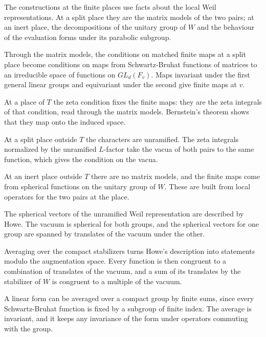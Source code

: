 The constructions at the finite places use facts about the local Weil
representations. At a split place they are the matrix models of the two pairs;
at an inert place, the decompositions of the unitary group of $W$ and the
behaviour of the evaluation forms under its parabolic subgroup.

Through the matrix models, the conditions on matched finite maps at a split place
become conditions on maps from Schwartz-Bruhat functions of matrices to an
irreducible space of functions on $GL_d(F_v)$. Maps invariant under the first
general linear groups and equivariant under the second give finite maps at $v$.

At a place of $T$ the zeta condition fixes the finite maps: they are the zeta
integrals of that condition, read through the matrix models. Bernstein's theorem
shows that they map onto the induced space.

At a split place outside $T$ the characters are unramified. The zeta integrals
normalized by the unramified $L$-factor take the vacua of both pairs to the same
function, which gives the condition on the vacua.

At an inert place outside $T$ there are no matrix models, and the finite maps
come from spherical functions on the unitary group of $W$. These are built from
local operators for the two pairs at the place.

The spherical vectors of the unramified Weil representation are described by
Howe. The vacuum is spherical for both groups, and the spherical vectors for one
group are spanned by translates of the vacuum under the other.

Averaging over the compact stabilizers turns Howe's description into statements
modulo the augmentation space. Every function is then congruent to a combination
of translates of the vacuum, and a sum of its translates by the stabilizer of $W$
is congruent to a multiple of the vacuum.

A linear form can be averaged over a compact group by finite sums, since every
Schwartz-Bruhat function is fixed by a subgroup of finite index. The average is
invariant, and it keeps any invariance of the form under operators commuting
with the group.

